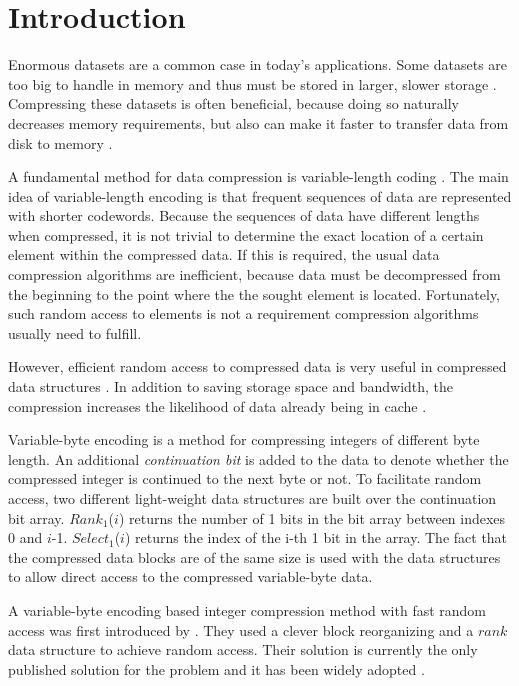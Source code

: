 \chapter{Introduction}
Enormous datasets are a common case in today's applications. Some datasets are too big to handle in memory and thus must be stored in larger, slower storage \citep{Hon10}. 
Compressing these datasets is often beneficial, because doing so naturally decreases memory requirements, but also can make it faster to transfer data from disk to memory \citep{Zob95, Wil99}.

A fundamental method for data compression is variable-length coding \citep{Sal99}. The main idea of variable-length encoding is that 
frequent sequences of data are represented with shorter codewords. Because the sequences of data have different lengths when compressed, it is 
not trivial to determine the exact location of a certain element within the compressed data. If this is required, the usual 
data compression algorithms are inefficient, because data must be decompressed from the beginning to the point where the the sought element is located. 
Fortunately, such random access to elements is not a requirement compression algorithms usually need to fulfill. 

However, efficient random access to compressed data is very useful in compressed data structures \citep{Ven13}.  In addition to saving storage space and bandwidth, the compression 
increases the likelihood of data already being in cache \citep{Sch02}. 

Variable-byte encoding is a method for compressing integers of different byte length. An additional \textit{continuation bit} is added to the data to denote whether the compressed integer
is continued to the next byte or not. To facilitate random access, two different light-weight data structures are built over the continuation bit array. $Rank_1$($i$) returns the number of 1 bits in the bit array between 
indexes 0 and $i$-1. $Select_1$($i$) returns the index of the i-th 1 bit in the array. The fact that the compressed data blocks are of the same size is used
with the data structures to allow direct access to the compressed variable-byte data.

A variable-byte encoding based integer compression method with fast random access was first introduced by \citep{Bri09}. They used a clever block 
reorganizing and a $rank$ data structure to achieve random access. Their solution is currently the only published solution for the problem and it 
has been widely adopted \citep[see, e.g.,][]{Kon17, Sha16}. 

